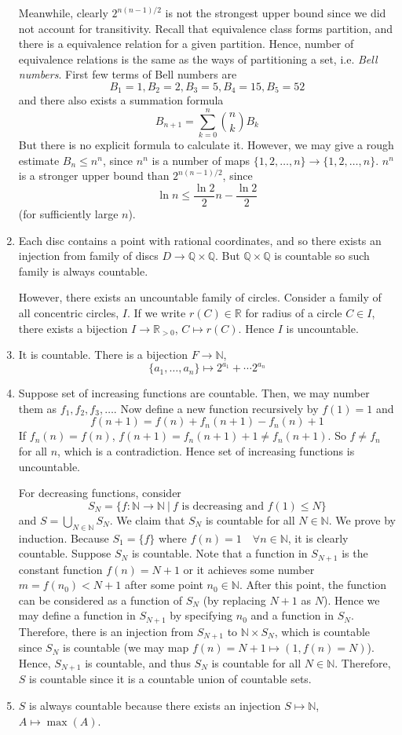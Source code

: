 \documentclass[10pt, a4paper, twoside]{report}
\begin{document}
\begin{enumerate}[{1.}]
    Meanwhile, clearly \(2^{n(n-1)/2}\) is not the strongest upper bound since we did not account for transitivity. Recall that equivalence class forms partition, and there is a equivalence relation for a given partition. Hence, number of equivalence relations is the same as the ways of partitioning a set, i.e. \emph{Bell numbers}. First few terms of Bell numbers are 
    \[B_1=1,B_2=2,B_3=5,B_4=15,B_5=52\]
    and there also exists a summation formula 
    \[B_{n+1}=\sum_{k=0}^{n}\binom nkB_k\]
    But there is no explicit formula to calculate it. However, we may give a rough estimate \(B_n\leq n^n\), since \(n^n\) is a number of maps \(\{1,2,\ldots,n\}\to\{1,2,\ldots,n\}\). \(n^n\) is a stronger upper bound than \(2^{n(n-1)/2}\), since 
    \[\ln n\leq\frac{\ln 2}2n-\frac{\ln 2}2\]
    (for sufficiently large \(n\)).
    \item Each disc contains a point with rational coordinates, and so there exists an injection from family of discs \(D\to\mathbb{Q}\times\mathbb{Q}\). But \(\mathbb{Q}\times\mathbb{Q}\) is countable so such family is always countable.
    
    However, there exists an uncountable family of circles. Consider a family of all concentric circles, \(I\). If we write \(r(C)\in\mathbb{R}\) for radius of a circle \(C\in I\), there exists a bijection \(I\to\mathbb{R}_{>0}\), \(C\mapsto r(C)\). Hence \(I\) is uncountable.
    \item It is countable. There is a bijection \(F\to\mathbb{N}\), 
    \[\{a_1,\ldots,a_n\}\mapsto 2^{a_1}+\cdots 2^{a_n}\]
    \item Suppose set of increasing functions are countable. Then, we may number them as \(f_1,f_2,f_3,\ldots\). Now define a new function recursively by \(f(1)=1\) and 
    \[f(n+1)=f(n)+f_n(n+1)-f_n(n)+1\]
    If \(f_n(n)= f(n)\), \(f(n+1)=f_n(n+1)+1\neq f_n(n+1)\). So \(f\neq f_n\) for all \(n\), which is a contradiction. Hence set of increasing functions is uncountable.

    For decreasing functions, consider 
    \[S_N=\{f:\mathbb{N}\to\mathbb{N}\:|\:f\text{  is decreasing and  }f(1)\leq N\}\]
    and \(S=\bigcup_{N\in\mathbb{N}}S_N\). We claim that \(S_N\) is countable for all \(N\in\mathbb{N}\). We prove by induction. Because \(S_1=\{f\}\) where \(f(n)=1\quad\forall n\in\mathbb{N}\), it is clearly countable. Suppose \(S_N\) is countable. Note that a function in \(S_{N+1}\) is the constant function \(f(n)=N+1\) or it achieves some number \(m=f(n_0)<N+1\) after some point \(n_0\in\mathbb{N}\). After this point, the function can be considered as a function of \(S_N\) (by replacing \(N+1\) as \(N\)). Hence we may define a function in \(S_{N+1}\) by specifying \(n_0\) and a function in \(S_N\). Therefore, there is an injection from \(S_{N+1}\) to \(\mathbb{N}\times S_N\), which is countable since \(S_N\) is countable (we may map \(f(n)=N+1\mapsto (1,f(n)=N)\)).  Hence, \(S_{N+1}\) is countable, and thus \(S_N\) is countable for all \(N\in\mathbb{N}\). Therefore, \(S\) is countable since it is a countable union of countable sets.
    \item \(S\) is always countable because there exists an injection \(S\mapsto\mathbb{N}\), \(A\mapsto\max(A)\).
    

\end{enumerate}
\end{document}
